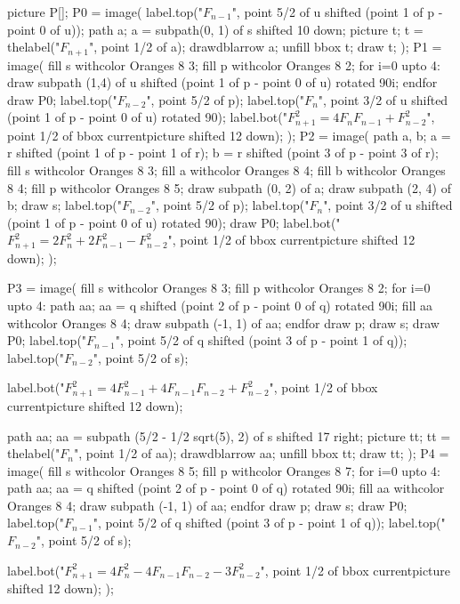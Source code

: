 \documentclass[oneside]{scrbook}
\begin{document}
picture P[]; 
P0 = image(
  label.top("$F_{n-1}$", point 5/2 of u shifted (point 1 of p - point 0 of u));
  path a; a = subpath(0, 1) of s shifted 10 down;
  picture t; t = thelabel("$F_{n+1}$", point 1/2 of a);
  drawdblarrow a; unfill bbox t; draw t;
);
P1 = image(
  fill s withcolor Oranges 8 3; fill p withcolor Oranges 8 2;
  for i=0 upto 4:
    draw subpath (1,4) of u shifted (point 1 of p - point 0 of u) rotated 90i;
  endfor
  draw P0;
  label.top("$F_{n-2}$", point 5/2 of p);
  label.top("$F_{n}$",   point 3/2 of u shifted (point 1 of p - point 0 of u) rotated 90);
  label.bot("$F_{n+1}^2 = 4 F_n F_{n-1} + F_{n-2}^2$", 
    point 1/2 of bbox currentpicture shifted 12 down);
);
P2 = image(
  path a, b;
  a = r shifted (point 1 of p - point 1 of r);
  b = r shifted (point 3 of p - point 3 of r);
  fill s withcolor Oranges 8 3; fill a withcolor Oranges 8 4;
  fill b withcolor Oranges 8 4; fill p withcolor Oranges 8 5;
  draw subpath (0, 2) of a; draw subpath (2, 4) of b; draw s;
  label.top("$F_{n-2}$", point 5/2 of p);
  label.top("$F_{n}$",   point 3/2 of u shifted (point 1 of p - point 0 of u) rotated 90);
  draw P0;
  label.bot("$F_{n+1}^2 = 2 F_n^2 + 2 F_{n-1}^2 - F_{n-2}^2$",
    point 1/2 of bbox currentpicture shifted 12 down);
);

P3 = image(
  fill s withcolor Oranges 8 3;
  fill p withcolor Oranges 8 2;
  for i=0 upto 4:
    path aa; aa = q shifted (point 2 of p - point 0 of q) rotated 90i;
    fill aa withcolor Oranges 8 4; draw subpath (-1, 1) of aa;
  endfor
  draw p; draw s;
  draw P0;
  label.top("$F_{n-1}$", point 5/2 of q shifted (point 3 of p - point 1 of q));
  label.top("$F_{n-2}$", point 5/2 of s);

label.bot("$F_{n+1}^2 = 4 F_{n-1}^2 + 4F_{n-1}F_{n-2} + F_{n-2}^2$", 
point 1/2 of bbox currentpicture shifted 12 down);

path aa; aa = subpath (5/2 - 1/2 sqrt(5), 2) of s shifted 17 right;
picture tt; tt = thelabel("$F_n$", point 1/2 of aa);
drawdblarrow aa; unfill bbox tt; draw tt;
);
P4 = image(
fill s withcolor Oranges 8 5;
fill p withcolor Oranges 8 7;
for i=0 upto 4:
    path aa; aa = q shifted (point 2 of p - point 0 of q) rotated 90i;
    fill aa withcolor Oranges 8 4; draw subpath (-1, 1) of aa;
endfor
draw p; draw s;
draw P0;
label.top("$F_{n-1}$", point 5/2 of q shifted (point 3 of p - point 1 of q));
label.top("$F_{n-2}$", point 5/2 of s);

label.bot("$F_{n+1}^2 = 4 F_n^2 - 4F_{n-1}F_{n-2} - 3F_{n-2}^2$", 
point 1/2 of bbox currentpicture shifted 12 down);
);
\end{document}
